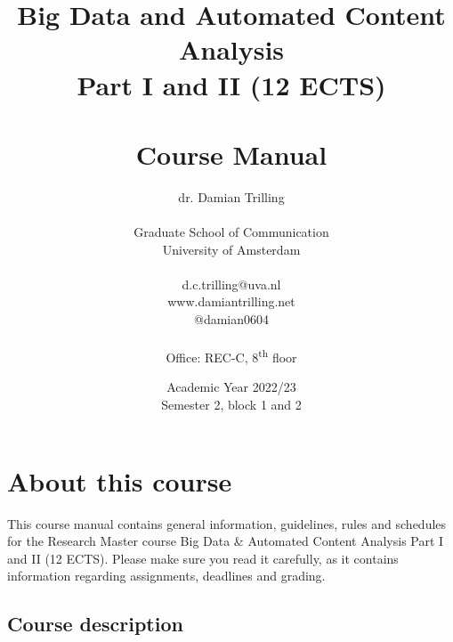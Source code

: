 \documentclass[a4paper,10pt,twocolumn]{report}
\title{Big Data and Automated Content Analysis\\ Part I and II (12 ECTS)\\~\\Course Manual}
\author{dr. Damian Trilling\\~\\Graduate School of Communication\\University of Amsterdam\\~\\d.c.trilling@uva.nl \\www.damiantrilling.net \\@damian0604 \\~\\Office: REC-C, 8\textsuperscript{th} floor}
\date{Academic Year 2022/23\\Semester 2, block 1 and 2}
\begin{document}
\maketitle



\chapter{About this course}

This course manual contains general information, guidelines, rules and schedules for the Research Master course Big Data \& Automated Content Analysis Part I and II (12 ECTS). Please make sure you read it carefully, as it  contains information regarding assignments, deadlines and grading.

\section{Course description}


\end{document}
